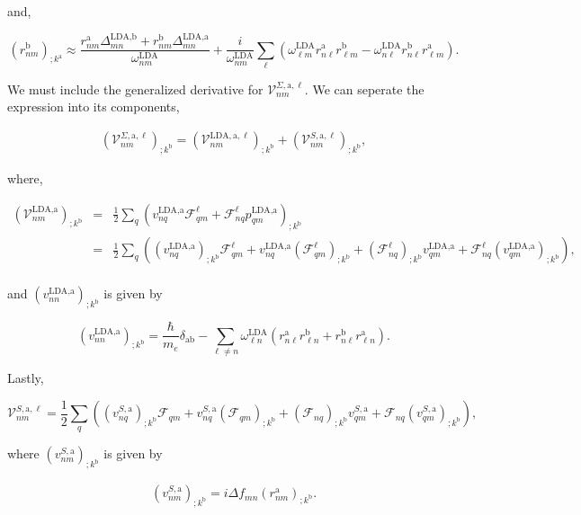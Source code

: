 \documentclass[11pt]{article}
\begin{document}
and,

\begin{equation}\label{eli.2}
(r^{\text{b}}_{nm})_{;k^{\text{a}}} \approx \frac{r^{\text{a}}_{nm}\Delta^{\text{LDA},\text{b}}_{mn} + r^{\text{b}}_{nm}\Delta^{\text{LDA},\text{a}}_{mn}}{\omega^\text{LDA}_{nm}} + \frac{i}{\omega^\text{LDA}_{nm}}\sum_{\ell}\left(\omega^\text{LDA}_{\ell m}r^{\text{a}}_{n\ell}r^{\text{b}}_{\ell m} - \omega^\text{LDA}_{n\ell}r^{\text{b}}_{n\ell}r^{\text{a}}_{\ell m}\right).
\end{equation}

We must include the generalized derivative for $\mathcal{V}^{\Sigma,\text{a},\ell}_{nm}$. We can seperate the expression into its components,

\begin{eqnarray}\label{a.1}
\left(\mathcal{V}^{\Sigma,\text{a},\ell}_{nm}\right)_{;k^\text{b}} = \left(\mathcal{V}^{\text{LDA},\text{a},\ell}_{nm}\right)_{;k^\text{b}} + \left(\mathcal{V}^{S,\text{a},\ell}_{nm}\right)_{;k^\text{b}},
\end{eqnarray}

where,

\begin{eqnarray}\label{a.2}
\left(\mathcal{V}^{\text{LDA},\text{a}}_{nm}\right)_{;k^\text{b}} &=&
\frac{1}{2}\sum_q\left(v^{\text{LDA},\text{a}}_{nq}\mathcal{F}^\ell_{qm}+\mathcal{F}^\ell_{nq} p^{\text{LDA},\text{a}}_{qm}\right) _{;k^\text{b}}\nonumber\\
&=& \frac{1}{2}\sum_q\left((v^{\text{LDA},\text{a}}_{nq})_{;k^\text{b}}\mathcal{F}^\ell_{qm} + v^{\text{LDA},\text{a}}_{nq}(\mathcal{F}^\ell_{qm})_{;k^\text{b}} + (\mathcal{F}^\ell_{nq})_{;k^\text{b}} v^{\text{LDA},\text{a}}_{qm} + \mathcal{F}^\ell_{nq} (v^{\text{LDA},\text{a}}_{qm})_{;k^\text{b}}\right),\\
\end{eqnarray} 

and $\left(v^{\text{LDA},\text{a}}_{nn}\right)_{;k^\text{b}}$ is given by

\begin{equation}
\left(v^{\text{LDA},\text{a}}_{nn}\right)_{;k^\text{b}} = \frac{\hbar}{m_e}\delta_{\text{a}\text{b}} - \sum_{\ell\ne n}\omega^\text{LDA}_{\ell n}\left(r^{\text{a}}_{n\ell}r^\text{b}_{\ell n} + r^\text{b}_{n\ell}r^{\text{a}}_{\ell n}\right).
\end{equation}

Lastly,

\begin{equation}\label{a.3b}
\mathcal{V}^{S,\text{a},\ell}_{nm} = \frac{1}{2}\sum_{q}\left((v^{S,\text{a}}_{nq})_{;k^\text{b}}\mathcal{F}_{qm} + v^{S,\text{a}}_{nq}(\mathcal{F}_{qm})_{;k^\text{b}} + (\mathcal{F}_{nq})_{;k^\text{b}}v_{qm}^{S,\text{a}} + \mathcal{F}_{nq} (v_{qm}^{S,\text{a}})_{;k^\text{b}}\right),
\end{equation}

where $(v^{S,\text{a}}_{nm})_{;k^\text{b}}$ is given by

\begin{eqnarray}\label{choni.1}
(v^{S,\text{a}}_{nm})_{;k^\text{b}}=i\Delta f_{mn}(r^\text{a}_{nm})_{;k^\text{b}}.
\end{eqnarray}
\end{document}
